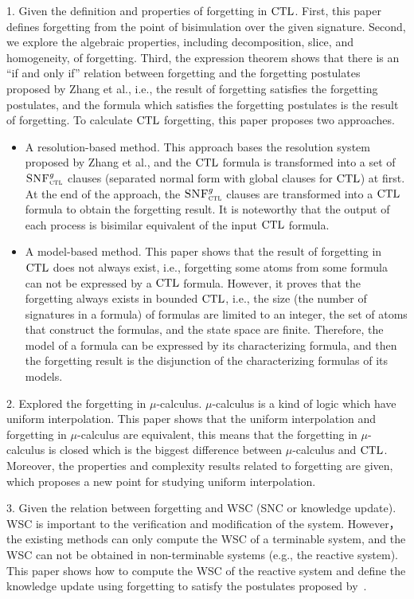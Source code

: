 \begin{englishabstract}
1. Given the definition and properties of forgetting in $\textrm{CTL}$. First, this paper defines forgetting from the point of bisimulation over the given signature. Second, we explore the algebraic properties, including decomposition, slice, and homogeneity, of forgetting. Third, the expression theorem shows that there is an ``if and only if” relation between forgetting and the forgetting postulates proposed by Zhang et al., i.e., the result of forgetting satisfies the forgetting postulates, and the formula which satisfies the forgetting postulates is the result of forgetting.
To calculate $\textrm{CTL}$ forgetting, this paper proposes two approaches.

\begin{itemize}
	\item A resolution-based method. This approach bases the resolution system proposed by Zhang et al., and the $\textrm{CTL}$ formula is transformed into a set of ${\textsc{SNF}_{\textsc{ctl}}^g}$ clauses (separated normal form with global clauses for $\textrm{CTL}$) at first. At the end of the approach, the ${\textsc{SNF}_{\textsc{ctl}}^g}$ clauses are transformed into a $\textrm{CTL}$ formula to obtain the forgetting result. It is noteworthy that the output of each process is bisimilar equivalent of the input $\textrm{CTL}$ formula.
	\item A model-based method. This paper shows that the result of forgetting in $\textrm{CTL}$ does not always exist, i.e., forgetting some atoms from some formula can not be expressed by a $\textrm{CTL}$ formula. However, it proves that the forgetting always exists in bounded $\textrm{CTL}$, i.e., the size (the number of signatures in a formula) of formulas are limited to an integer, the set of atoms that construct the formulas, and the state space are finite. Therefore, the model of a formula can be expressed by its characterizing formula, and then the forgetting result is the disjunction of the characterizing formulas of its models. 
\end{itemize}

2. Explored the forgetting in $\mu$-calculus. $\mu$-calculus is a kind of logic which have uniform interpolation. This paper shows that the uniform interpolation and forgetting in $\mu$-calculus are equivalent, this means that the forgetting in $\mu$-calculus is closed which is the biggest difference between $\mu$-calculus and $\textrm{CTL}$. Moreover, the properties and complexity results related to forgetting are given, which proposes a new point for studying uniform interpolation.

3. Given the relation between forgetting and WSC (SNC or knowledge update). WSC is important to the verification and modification of the system. However， the existing methods can only compute the WSC of a terminable system, and the WSC can not be obtained in non-terminable systems (e.g., the reactive system). This paper shows how to compute the WSC of the reactive system and define the knowledge update using forgetting to satisfy the postulates proposed by~\citeauthor{katsuno91mendelzon}.


\end{englishabstract}
